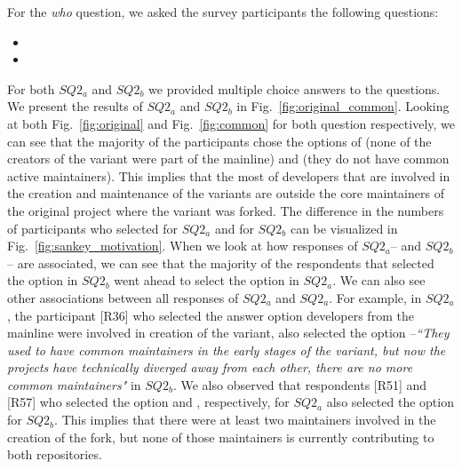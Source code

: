 For the \textit{who} question, we asked the survey participants the following questions:

\begin{itemize}
\item  \rqTwoOne
\item \rqTwoTwo
\end{itemize}


For both $SQ2_{a}$ and $SQ2_{b}$ we provided multiple choice answers to the questions. We present the results of $SQ2_{a}$ and $SQ2_{b}$ in Fig.~\ref{fig:original_common}. Looking at both Fig.~\ref{fig:original} and Fig.~\ref{fig:common} for both question respectively, we can see that the majority of the participants chose the options of  (none of the creators of the variant were part of the mainline) and  (they do not have common active maintainers).
This implies that the most of developers that are involved in the creation and maintenance of the variants are outside the core maintainers of the original project where the variant was forked.
The difference in the numbers of participants who selected   for $SQ2_{a}$ and  for $SQ2_{b}$ can be visualized in Fig.~\ref{fig:sankey_motivation}.
When we look at how responses of $SQ2_{a}$-- and $SQ2_{b}$-- are associated, we can see that the majority of the respondents that selected the option  in $SQ2_{b}$ went ahead to select the option  in $SQ2_{a}$. We can also see other associations between all responses of $SQ2_{a}$ and $SQ2_{a}$.
For example, in $SQ2_{a}$, the participant [R36] who selected the answer option  developers from the mainline were involved in creation of the variant, also selected the option --\emph{``They used to have common maintainers in the early stages of the variant, but now the projects have technically diverged away from each other, there are no more common maintainers"} in $SQ2_{b}$.
We also observed that respondents [R51] and [R57] who selected the option  and , respectively, for $SQ2_{a}$ also selected the option  for $SQ2_{b}$. This implies that there were at least two maintainers involved in the creation of the fork, but none of those maintainers is currently contributing to both repositories.



